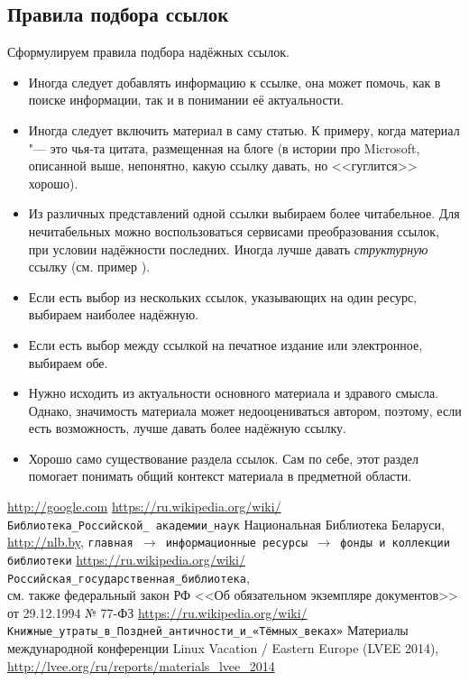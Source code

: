 \documentclass[10pt, a5paper]{article}
\begin{document}
\subsection*{Правила подбора ссылок}
Сформулируем правила подбора надёжных ссылок.
\begin{itemize}
\item Иногда следует добавлять информацию к ссылке, она может помочь, как 
в поиске информации, так и в понимании её актуальности.
\item Иногда следует включить материал в саму статью. К примеру, когда
материал "--- это чья-та цитата, размещенная на блоге (в 
истории про Microsoft, описанной выше, непонятно, какую ссылку
давать, но <<гуглится>> хорошо).
\item Из различных представлений одной ссылки выбираем более читабельное.
Для нечитабельных можно воспользоваться сервисами преобразования ссылок, 
при условии надёжности последних. Иногда лучше давать \textit{структурную} ссылку 
(см. пример \cite{AY3}).
\item Если есть выбор из нескольких ссылок, указывающих на один ресурс,
выбираем наиболее надёжную.
\item Если есть выбор между ссылкой на печатное издание или электронное,
выбираем обе.
\item Нужно исходить из актуальности основного материала и 
здравого смысла. Однако, значимость материала может недооцениваться 
автором, поэтому, если есть возможность, лучше давать более надёжную 
ссылку. 
\item Хорошо само существование раздела ссылок. Сам по себе, 
этот раздел помогает понимать общий контекст материала
в предметной области.  

\end{itemize}


\begin{thebibliography}{9}
 \url{http://google.com}
 \url{https://ru.wikipedia.org/wiki/}\\ \texttt{Библиотека\_Российской\_ академии\_наук}
 Национальная Библиотека Беларуси, \url{http://nlb.by}, \texttt{главная $\to$ информационные ресурсы $\to$ фонды и коллекции библиотеки}
 \url{https://ru.wikipedia.org/wiki/}\\ \texttt{Российская\_государственная\_библиотека},\\ 
см. также федеральный закон РФ <<Об обязательном экземпляре документов>> от 29.12.1994 № 77-ФЗ
 \url{https://ru.wikipedia.org/wiki/}\\ \texttt{Книжные\_утраты\_в\_Поздней\_античности\_и\_«Тёмных\_веках»}
 Материалы международной конференции Linux Vacation / Eastern
Europe (LVEE 2014), \url{http://lvee.org/ru/reports/materials_lvee_2014}
\end{thebibliography}
\end{document}
